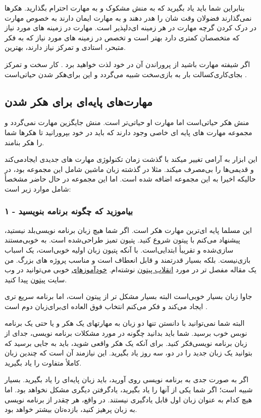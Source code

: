 بنابراین شما باید یاد بگیرید که به منش مشکوک و به مهارت احترام بگذارید. هکرها نمی‌گذارند فضولان وقت شان را هدر دهند و به مهارت ایمان دارند به خصوص مهارت در درک کردن گرچه مهارت در هر زمینه ای‌دلپذیر است. مهارت در زمینه های مورد نیاز که متخصصان کمتری دارد بهتر است و تخصص در زمینه های مورد نیاز که به فکر متبحر، استادی و تمرکز نیاز دارند، بهترین.

اگر شیفته مهارت باشید از پروراندن آن در خود لذت خواهید برد . کار سخت و تمرکز بجای‌کاری‌کسالت بار به بازی‌سخت شبیه می‌گردد و این برای‌هکر شدن حیاتی‌است .
\subsection*{مهارت‌های پایه‌ای برای هکر شدن}
منش هکر حیاتی‌است اما مهارت او حیاتی‌تر است. منش جایگزین مهارت نمی‌گردد و مجموعه مهارت های پایه ای خاصی وجود دارند که باید در خود بپرورانید تا هکرها شما را هکر بنامند.

این ابزار به آرامی تغییر میکند با گذشت زمان تکنولوژی مهارت های جدیدی ایجادمی‌کند و قدیمی‌‌ها را بی‌مصرف میکند. مثلا در گذشته زبان ماشین شامل این مجموعه بود، در حالیکه 
 اخیرا به این مجموعه اضافه شده است. اما این مجموعه در حال حاضر مشخصأ شامل موارد زیر است:
\subsubsection*{۱ - بیاموزید که چگونه برنامه بنویسید}
این مسلما پایه ای‌ترین مهارت هکر است. اگر شما هیچ زبان برنامه نویسی‌بلد نیستید، پیشنهاد می‌کنم با پیتون شروع کنید. پتیون تمیز طراحی‌شده است. به خوبی‌مستند سازی‌شده و تقریبأ ابتدایی‌است. با آنکه پتیون زبان اولیه خوبی‌است، یک اسباب بازی‌نیست. بلکه بسیار قدرتمند و قابل انعطاف است و مناسب پروژه های بزرگ. من یک مقاله مفصل تر در مورد
\href{http://www.linuxjournal.com/article.php?sid=3882}{انقلاب پیتون}
نوشته‌ام.
\href{http://www.python.org/doc/Intros.html}{خودآموزهای}
خوبی می‌توانید در وب سایت
\href{http://www.python.org/}{پیتون}
پیدا کنید.

جاوا زبان بسیار خوبی‌است البته بسیار مشکل تر از پیتون است، اما برنامه سریع تری ایجاد می‌کند و فکر می‌کنم انتخاب فوق العاده ای‌برای‌زبان دوم است .

البته شما نمی‌توانید با دانستن تنها دو زبان به مهارتهای یک هکر و یا حتی یک برنامه نوبس خوب برسید. شما باید بدانید چگونه در مورد مشکلات برنامه نویسی‌، جدای از زبان برنامه نویسی‌فکر کنید. برای آنکه یک هکر واقعی شوید، باید به جایی برسید که بتوانید یک زبان جدید را در دو، سه روز یاد بگیرید. این نیازمند آن است که چندین زبان کاملأ متفاوت را یاد بگیرید.

اگر به صورت جدی به برنامه نویسی روی آورید، باید  زبان پایه‌ای
 را یاد بگیرید. 
 بسیار شبیه  است؛ اگر شما یکی از آنها را یاد بگیرید، یادگرفتن دیگری مشکل نخواهد بود. اما هیچ کدام به عنوان زبان اول قابل یادگیری نیستند. در واقع، هر چقدر از برنامه نویسی به زبان  پرهیز کنید، بازده‌تان بیشتر خواهد بود.
 
